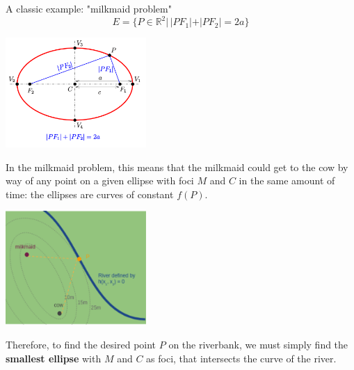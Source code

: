 \documentclass[11pt,compress,t,notes=noshow, xcolor=table]{beamer}
\begin{document}
\begin{vbframe}{A classic example: "milkmaid problem"}
$$
E = \{ P \in \mathbb{R}^2 | \, |PF_1| + |PF_2| = 2a \}
$$

\vspace*{0.2cm} 

\begin{center}
	\includegraphics[width = 0.4\textwidth]{figure_man/ellipse.png}
\end{center}

\framebreak 




In the milkmaid problem, this means that the milkmaid could get to the cow by way of any point on a given ellipse with foci $M$ and $C$ in the same amount of time: the ellipses are curves of constant $f(P)$. 

\vspace*{0.2cm} 

\begin{center}
	\includegraphics[width = 0.4\textwidth]{figure_man/milkmaid4.png}
\end{center}


\framebreak

Therefore, to find the desired point $P$ on the riverbank, we must simply find the \textbf{smallest ellipse} with $M$ and $C$ as foci, that intersects the curve of the river. 

\vspace*{0.2cm} 


\end{vbframe}
\end{document}
